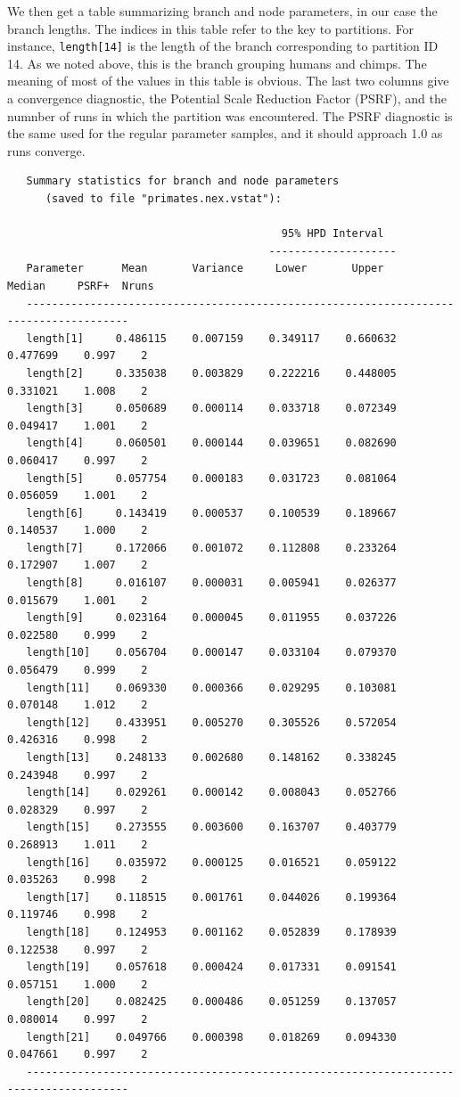 \documentclass[12pt]{book}
\begin{document}
We then get a table summarizing branch and node parameters, in our case the branch lengths. The indices in 
this table refer to the key to partitions. For instance, \texttt{length[14]} is the length of the branch 
corresponding to partition ID 14. As we noted above, this is the branch grouping humans and chimps. The 
meaning of most of the values in this table is obvious. The last two columns give a convergence diagnostic, 
the Potential Scale Reduction Factor (PSRF), and the numnber of runs in which the partition was encountered. 
The PSRF diagnostic is the same used for the regular parameter samples, and it should approach 1.0 as runs 
converge.

\begin{singlespacing}
\tiny
\begin{verbatim}
   Summary statistics for branch and node parameters
      (saved to file "primates.nex.vstat"):

                                           95% HPD Interval
                                         --------------------
   Parameter      Mean       Variance     Lower       Upper       Median     PSRF+  Nruns
   --------------------------------------------------------------------------------------
   length[1]     0.486115    0.007159    0.349117    0.660632    0.477699    0.997    2
   length[2]     0.335038    0.003829    0.222216    0.448005    0.331021    1.008    2
   length[3]     0.050689    0.000114    0.033718    0.072349    0.049417    1.001    2
   length[4]     0.060501    0.000144    0.039651    0.082690    0.060417    0.997    2
   length[5]     0.057754    0.000183    0.031723    0.081064    0.056059    1.001    2
   length[6]     0.143419    0.000537    0.100539    0.189667    0.140537    1.000    2
   length[7]     0.172066    0.001072    0.112808    0.233264    0.172907    1.007    2
   length[8]     0.016107    0.000031    0.005941    0.026377    0.015679    1.001    2
   length[9]     0.023164    0.000045    0.011955    0.037226    0.022580    0.999    2
   length[10]    0.056704    0.000147    0.033104    0.079370    0.056479    0.999    2
   length[11]    0.069330    0.000366    0.029295    0.103081    0.070148    1.012    2
   length[12]    0.433951    0.005270    0.305526    0.572054    0.426316    0.998    2
   length[13]    0.248133    0.002680    0.148162    0.338245    0.243948    0.997    2
   length[14]    0.029261    0.000142    0.008043    0.052766    0.028329    0.997    2
   length[15]    0.273555    0.003600    0.163707    0.403779    0.268913    1.011    2
   length[16]    0.035972    0.000125    0.016521    0.059122    0.035263    0.998    2
   length[17]    0.118515    0.001761    0.044026    0.199364    0.119746    0.998    2
   length[18]    0.124953    0.001162    0.052839    0.178939    0.122538    0.997    2
   length[19]    0.057618    0.000424    0.017331    0.091541    0.057151    1.000    2
   length[20]    0.082425    0.000486    0.051259    0.137057    0.080014    0.997    2
   length[21]    0.049766    0.000398    0.018269    0.094330    0.047661    0.997    2
   --------------------------------------------------------------------------------------
\end{verbatim}
\normalsize
\end{singlespacing}
\end{document}
